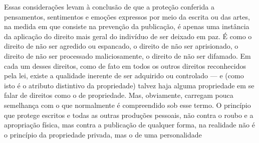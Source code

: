 Essas considerações levam à conclusão de que a proteção conferida a
pensamentos, sentimentos e emoções expressos por meio da escrita ou das
artes, na medida em que consiste na prevenção da publicação, é apenas
uma instância da aplicação do direito mais geral do indivíduo de ser
deixado em paz. É como o direito de não ser agredido ou espancado, o
direito de não ser aprisionado, o direito de não ser processado
maliciosamente, o direito de não ser difamado. Em cada um desses
direitos, como de fato em todos os outros direitos reconhecidos pela
lei, existe a qualidade inerente de ser adquirido ou controlado --- e
(como isto é o atributo distintivo da propriedade) talvez haja alguma
propriedade em se falar de direitos como o de propriedade. Mas,
obviamente, carregam pouca semelhança com o que normalmente é
compreendido sob esse termo. O princípio que protege escritos e todas as
outras produções pessoais, não contra o roubo e a apropriação física,
mas contra a publicação de qualquer forma, na realidade não é o
princípio da propriedade privada, mas o de uma personalidade
